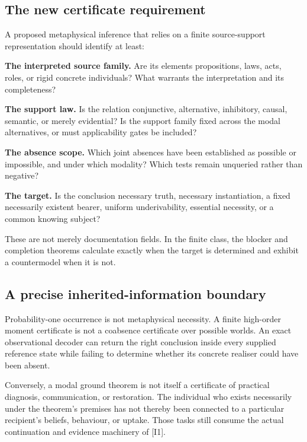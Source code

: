 \documentclass[11pt,a4paper]{article}
\begin{document}
\subsection{The new certificate
requirement}\label{the-new-certificate-requirement}

A proposed metaphysical inference that relies on a finite source-support
representation should identify at least:

\textbf{The interpreted source family.} Are its elements propositions,
laws, acts, roles, or rigid concrete individuals? What warrants the
interpretation and its completeness?

\textbf{The support law.} Is the relation conjunctive, alternative,
inhibitory, causal, semantic, or merely evidential? Is the support
family fixed across the modal alternatives, or must applicability gates
be included?

\textbf{The absence scope.} Which joint absences have been established
as possible or impossible, and under which modality? Which tests remain
unqueried rather than negative?

\textbf{The target.} Is the conclusion necessary truth, necessary
instantiation, a fixed necessarily existent bearer, uniform
underivability, essential necessity, or a common knowing subject?

These are not merely documentation fields. In the finite class, the
blocker and completion theorems calculate exactly when the target is
determined and exhibit a countermodel when it is not.

\subsection{A precise inherited-information
boundary}\label{a-precise-inherited-information-boundary}

Probability-one occurrence is not metaphysical necessity. A finite
high-order moment certificate is not a coabsence certificate over
possible worlds. An exact observational decoder can return the right
conclusion inside every supplied reference state while failing to
determine whether its concrete realiser could have been absent.

Conversely, a modal ground theorem is not itself a certificate of
practical diagnosis, communication, or restoration. The individual who
exists necessarily under the theorem's premises has not thereby been
connected to a particular recipient's beliefs, behaviour, or uptake.
Those tasks still consume the actual continuation and evidence machinery
of {[}I1{]}.
\end{document}
